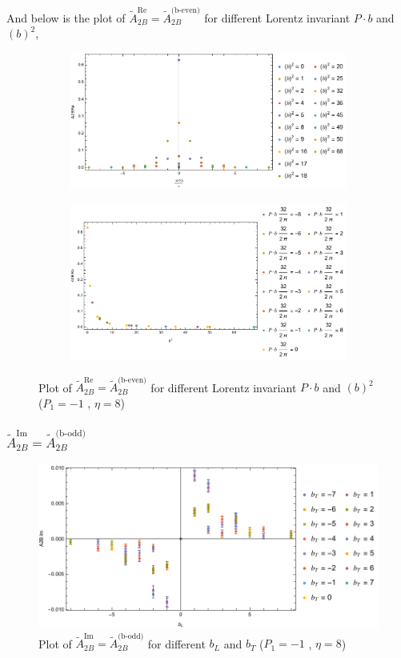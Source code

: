 \documentclass[]{article}
\numberwithin{equation}{section}
\newcommand{\tAmp}{\widetilde{A}}
\newcommand{\tAmp}{\ensuremath{\widetilde{A}^{(+)}}}
\begin{document}
And below is the plot of $\tAmp^{\text{Re}}_{2B}=\tAmp^{\text{(b-even)}}_{2B}$ for different Lorentz invariant $P\cdot b$ and $(b)^2$,
\begin{figure}[h!]
     \centering
     \begin{subfigure}[b]{0.45\textwidth}
         \centering
         \includegraphics[width=\textwidth]{bP_A2B_b_even_P1_-1_eta_8.pdf}
     \end{subfigure}
     \begin{subfigure}[b]{0.45\textwidth}
         \centering
         \includegraphics[width=\textwidth]{bsq_A2B_b_even_P1_-1_eta_8.pdf}
     \end{subfigure}
        \caption{Plot of $\tAmp^{\text{Re}}_{2B}=\tAmp^{\text{(b-even)}}_{2B}$ for different Lorentz invariant $P\cdot b$ and $(b)^2$  ($P_{1} = -1$ , $\eta=8$)}
\end{figure}


\subsubsection{$\tAmp^{\text{Im}}_{2B}=\tAmp^{\text{(b-odd)}}_{2B}$}
\begin{figure}[h!]
    \centering
    \includegraphics[width=0.45\linewidth]{bLbT_A2B_b_odd_P1_-1_eta_8.pdf}
    \caption{Plot of  $\tAmp^{\text{Im}}_{2B}=\tAmp^{\text{(b-odd)}}_{2B}$ for different $b_{L}$ and $b_{T}$  ($P_{1} = -1$ , $\eta=8$)}
\end{figure}
\end{document}
